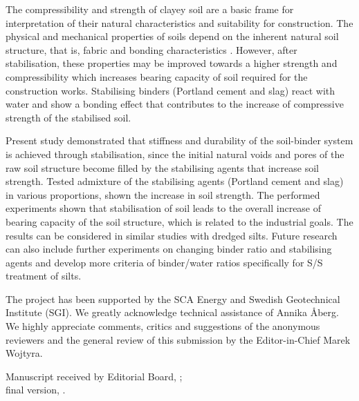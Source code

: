 \documentclass{amestyle}
\begin{document}
The compressibility and strength of clayey soil are a basic frame for interpretation of their natural characteristics and suitability for construction. The physical and mechanical properties of soils depend on the inherent natural soil structure, that is, fabric and bonding characteristics \cite{Burland}. However, after stabilisation, these properties may be improved towards a higher strength and compressibility which increases bearing capacity of soil required for the construction works. Stabilising binders (Portland cement and slag) react with water and show a bonding effect that contributes to the increase of compressive strength of the stabilised soil. 

Present study demonstrated that stiffness and durability of the soil-binder system is achieved through stabilisation, since the initial natural voids and pores of the raw soil structure become filled by the stabilising agents that increase soil strength. Tested admixture of the stabilising agents (Portland cement and slag) in various proportions, shown the increase in soil strength. The performed experiments shown that stabilisation of soil leads to the overall increase of bearing capacity of the soil structure, which is related to the industrial goals. The results can be considered in similar studies with dredged silts. Future research can also include further experiments on changing binder ratio and stabilising agents and develop more criteria of binder/water ratios specifically for S/S treatment of silts.

\begin{acknowledgements}
  The project has been supported by the SCA Energy and Swedish Geotechnical Institute (SGI). We greatly acknowledge technical assistance of Annika Åberg. We highly appreciate comments, critics and suggestions of the anonymous reviewers and the general review of this submission by the Editor-in-Chief Marek Wojtyra.
\end{acknowledgements}

\begin{receiptnote}
  Manuscript received by Editorial Board, \theamereceived; \\ 
  final version, \theameaccepted.
\end{receiptnote}





\end{document}
